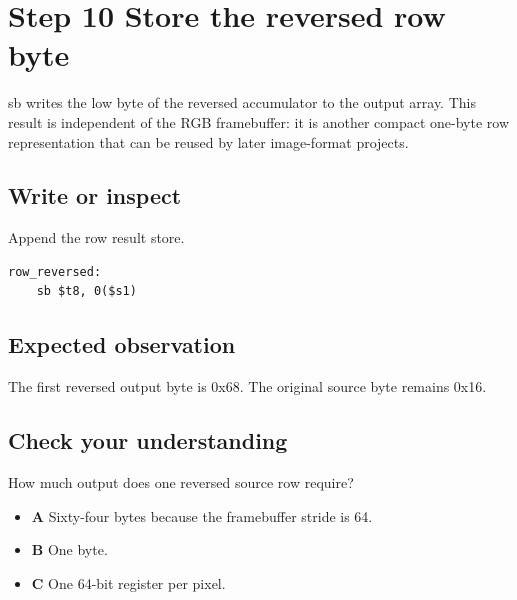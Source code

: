 \section{Step 10 Store the reversed row
  byte}\label{003-eight-byte-sprite-s10-step-10-store-the-reversed-row-byte}

sb writes the low byte of the reversed accumulator to the output array.
This result is independent of the RGB framebuffer: it is another compact
one-byte row representation that can be reused by later image-format
projects.

\subsection{Write or
  inspect}\label{003-eight-byte-sprite-s10-write-or-inspect}

Append the row result store.

\begin{verbatim}
row_reversed:
    sb $t8, 0($s1)
\end{verbatim}

\subsection{Expected
  observation}\label{003-eight-byte-sprite-s10-expected-observation}

The first reversed output byte is 0x68. The original source byte remains
0x16.

\subsection{Check your
  understanding}\label{003-eight-byte-sprite-s10-check-your-understanding}

How much output does one reversed source row require?

\begin{itemize}
  \tightlist
  \item
        \textbf{A} Sixty-four bytes because the framebuffer stride is 64.
  \item
        \textbf{B} One byte.
  \item
        \textbf{C} One 64-bit register per pixel.
\end{itemize}
